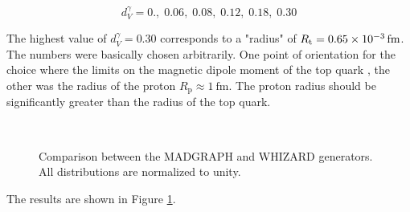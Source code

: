 \begin{equation}
d_V^{\gamma} = 0.,\; 0.06,\; 0.08,\; 0.12,\; 0.18,\; 0.30
\label{eq_ano_val}
\end{equation}

The highest value of $d_V^{\gamma} = 0.30$ corresponds to a "radius" of $R_{\mathrm{t}} = \SI{0.65d-3}{\femto \meter}$. The numbers were basically chosen arbitrarily. One point of orientation for the choice where the limits on the magnetic dipole moment of the top quark , the other was the radius of the proton $R_{\mathrm{p}} \approx \SI{1}{\femto \meter}$. The proton radius should be significantly greater than the radius of the top quark. \\


\begin{figure}
  \\
  \caption{Comparison between the MADGRAPH and WHIZARD generators. All distributions are normalized to unity.}
  \label{fig_ano_comp}
\end{figure}

The results are shown in Figure \ref{fig_ano_comp}. 